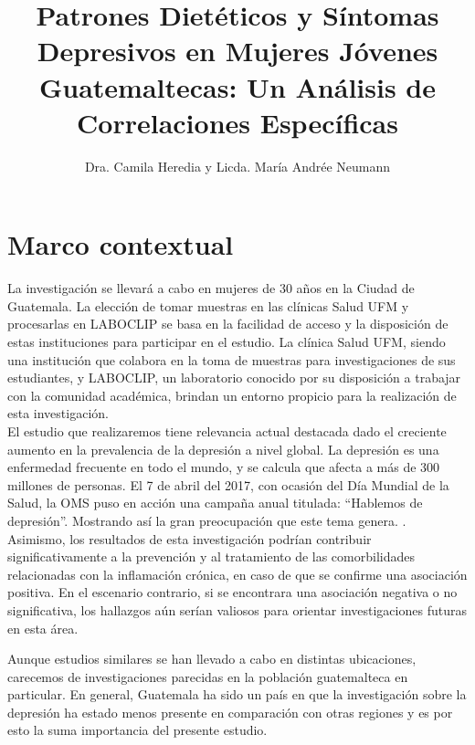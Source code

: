 \documentclass[jou]{apa7}
\title{Patrones Dietéticos y Síntomas Depresivos en Mujeres Jóvenes Guatemaltecas: Un Análisis de Correlaciones Específicas}
\author{Dra. Camila Heredia y Licda. María Andrée Neumann}
\affiliation{Escuela de Postgrado, Universidad Francisco Marroquín}
\begin{document}
	\maketitle
	
	
	
	\section{Marco contextual}\label{marco-contextual}
	
	La investigación se llevará a cabo en mujeres de 30 años en la Ciudad de
	Guatemala. La elección de tomar muestras en las clínicas Salud UFM y
	procesarlas en LABOCLIP se basa en la facilidad de acceso y la
	disposición de estas instituciones para participar en el estudio. La
	clínica Salud UFM, siendo una institución que colabora en la toma de
	muestras para investigaciones de sus estudiantes, y LABOCLIP, un
	laboratorio conocido por su disposición a trabajar con la comunidad
	académica, brindan un entorno propicio para la realización de esta
	investigación.\\
	
	El estudio que realizaremos tiene relevancia actual destacada dado el
	creciente aumento en la prevalencia de la depresión a nivel global. La
	depresión es una enfermedad frecuente en todo el mundo, y se calcula que
	afecta a más de 300 millones de personas. El 7 de abril del 2017, con
	ocasión del Día Mundial de la Salud, la OMS puso en acción una campaña
	anual titulada: ``Hablemos de depresión''. Mostrando así la gran
	preocupación que este tema genera. \parencite{Toshi2022}.\\
	
	
	
	Asimismo, los resultados de esta investigación podrían contribuir
	significativamente a la prevención y al tratamiento de las
	comorbilidades relacionadas con la inflamación crónica, en caso de que
	se confirme una asociación positiva. En el escenario contrario, si se
	encontrara una asociación negativa o no significativa, los hallazgos aún
	serían valiosos para orientar investigaciones futuras en esta área.
	
	Aunque estudios similares se han llevado a cabo en distintas
	ubicaciones, carecemos de investigaciones parecidas en la población
	guatemalteca en particular. En general, Guatemala ha sido un país en que
	la investigación sobre la depresión ha estado menos presente en
	comparación con otras regiones y es por esto la suma importancia del
	presente estudio.\\
	
\end{document}
